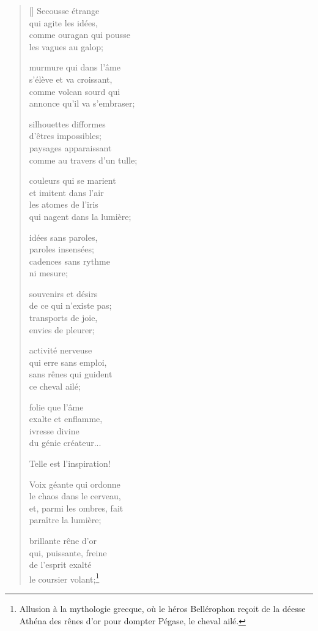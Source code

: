 \documentclass[a4paper,12pt]{book}
\begin{document}
\begin{verse}[\versewidth]
  Secousse étrange \\
  qui agite les idées, \\
  comme ouragan qui pousse \\
  les vagues au galop;

  murmure qui dans l'âme \\
  s'élève et va croissant, \\
  comme volcan sourd qui \\
  annonce qu'il va s'embraser;

  silhouettes difformes \\
  d'êtres impossibles; \\
  paysages apparaissant \\
  comme au travers d'un tulle;

  couleurs qui se marient \\
  et imitent dans l'air \\
  les atomes de l'iris \\
  qui nagent dans la lumière;

  idées sans paroles, \\
  paroles insensées; \\
  cadences sans rythme \\
  ni mesure;

  souvenirs et désirs \\
  de ce qui n'existe pas; \\
  transports de joie, \\
  envies de pleurer;

  activité nerveuse \\
  qui erre sans emploi, \\
  sans rênes qui guident \\
  ce cheval ailé;

  folie que l'âme \\
  exalte et enflamme, \\
  ivresse divine \\
  du génie créateur...

  Telle est l'inspiration!

  Voix géante qui ordonne \\
  le chaos dans le cerveau, \\
  et, parmi les ombres, fait \\
  paraître la lumière;

  brillante rêne d'or \\
  qui, puissante, freine \\
  de l'esprit exalté \\
  le coursier volant;\footnote{Allusion à la mythologie grecque, où le
  héros Bellérophon reçoit de la déesse Athéna des rênes d'or pour
  dompter Pégase, le cheval ailé.}


\end{verse}
\end{document}
